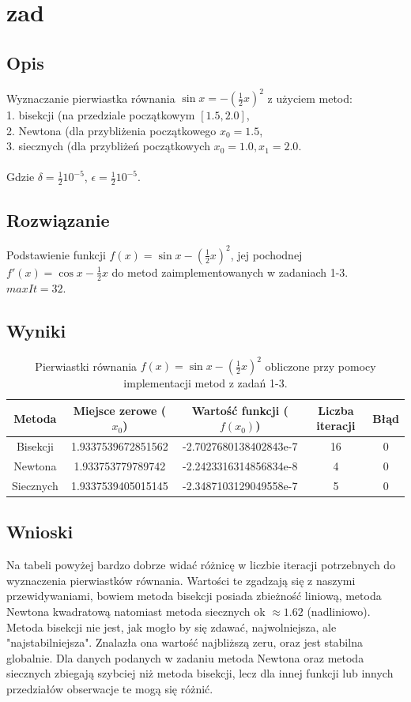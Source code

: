 \documentclass[10pt,a4paper, polish]{article}
\begin{document}
\section{zad}

\subsection*{Opis}
Wyznaczanie pierwiastka równania $\sin{x} = -(\frac{1}{2}x)^2$ z użyciem metod:\\
1. bisekcji (na przedziale początkowym $[1.5, 2.0]$,\\
2. Newtona (dla przybliżenia początkowego $x_0 = 1.5$,\\  
3. siecznych (dla przybliżeń początkowych $x_0 = 1.0, x_1 = 2.0$.\\\\
Gdzie $\delta = \frac{1}{2}10^{-5}$, $\epsilon = \frac{1}{2}10^{-5}$.

\subsection*{Rozwiązanie}
Podstawienie funkcji $f(x) = \sin{x}-(\frac{1}{2}x)^2$, jej pochodnej $f'(x) = \cos{x} - \frac{1}{2}x$ do metod zaimplementowanych w zadaniach 1-3. $maxIt = 32$.

\subsection*{Wyniki}

\begin{table}[h]
        \centering
        \footnotesize
\begin{tabular}{c|c|c|c|c}
Metoda    & {Miejsce zerowe ($x_0$)} 	& {Wartość funkcji ($f(x_0)$)} 	& Liczba iteracji	& Błąd \\ \hline
Bisekcji  & 1.9337539672851562       	&-2.7027680138402843e-7			& 16 				& 0 \\ 
Newtona   &  1.933753779789742			&-2.2423316314856834e-8			& 4 				& 0 \\ 
Siecznych & 1.9337539405015145			&-2.3487103129049558e-7			& 5 				& 0 \\ 
\end{tabular}
\caption{Pierwiastki równania $f(x) = \sin{x}-(\frac{1}{2}x)^2$ obliczone przy pomocy implementacji metod z zadań 1-3.}
\label{table:1}
\end{table}	

\subsection*{Wnioski}
Na tabeli powyżej bardzo dobrze widać różnicę w liczbie iteracji potrzebnych do wyznaczenia pierwiastków równania. Wartości te zgadzają się z naszymi przewidywaniami, bowiem metoda bisekcji posiada zbieżność liniową, metoda Newtona kwadratową natomiast metoda siecznych ok $\approx 1.62$ (nadliniowo). Metoda bisekcji nie jest, jak mogło by się zdawać, najwolniejsza, ale "najstabilniejsza". Znalazła ona wartość najbliższą zeru, oraz jest stabilna globalnie. Dla danych podanych w zadaniu metoda Newtona oraz metoda siecznych zbiegają szybciej niż metoda bisekcji, lecz dla innej funkcji lub innych przedziałów obserwacje te mogą się różnić.
\end{document}

